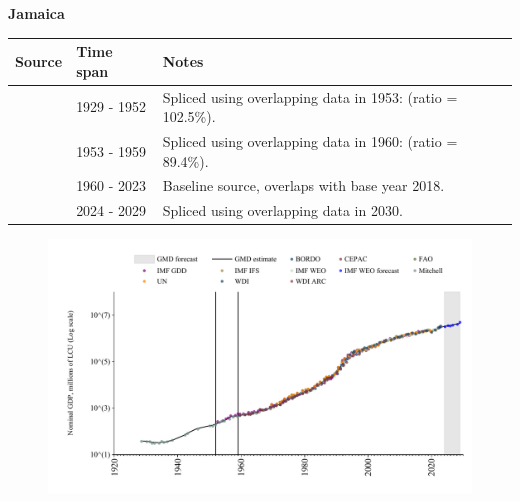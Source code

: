 \documentclass[12pt,a4paper,landscape]{article}
\begin{document}
\begin{adjustbox}{max totalsize={\paperwidth}{\paperheight},center}
\begin{minipage}[t][\textheight][t]{\textwidth}
\vspace*{0.5cm}
{}
\begin{center}
{\Large\bfseries Jamaica}
\end{center}
\vspace{0.5cm}
\begin{table}[H]
\centering
\small
\begin{tabular}{|l|l|l|}
\hline
\textbf{Source} & \textbf{Time span} & \textbf{Notes} \\
\hline
\rowcolor{white}\cite{Mitchell}& 1929 - 1952 &Spliced using overlapping data in 1953: (ratio = 102.5\%).\\
\rowcolor{lightgray}\cite{IMF_GDD}& 1953 - 1959 &Spliced using overlapping data in 1960: (ratio = 89.4\%).\\
\rowcolor{white}\cite{WDI}& 1960 - 2023 &Baseline source, overlaps with base year 2018.\\
\rowcolor{lightgray}\cite{IMF_WEO_forecast}& 2024 - 2029 &Spliced using overlapping data in 2030.\\
\hline
\end{tabular}
\end{table}
\begin{figure}[H]
\centering
\includegraphics[width=\textwidth,height=0.6\textheight,keepaspectratio]{graphs/JAM_nGDP.pdf}
\end{figure}
\end{minipage}
\end{adjustbox}
\end{document}
